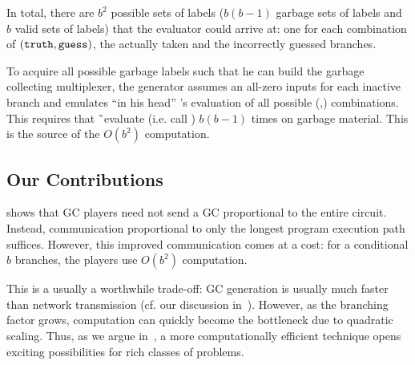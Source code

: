 In total, there are $b^2$ possible sets of labels ($b(b-1)$ garbage sets of labels and $b$ valid sets of labels)  that the evaluator
could arrive at: one for each combination of $(\mathtt{truth},\mathtt{guess})$, the  actually taken  and
the incorrectly guessed branches.
%


To acquire all possible garbage labels such that he can build the
garbage collecting multiplexer, the \HK generator assumes an all-zero
inputs for each
inactive branch and emulates ``in his head'' \E's evaluation of all possible (\truth,\guess) combinations.
This requires that \G\ evaluate (i.e. call \Ev) $b(b-1)$ times on garbage material.
This is the source of the $O(b^2)$ computation.






\subsection{Our Contributions}
\label{sec:ourContrib}

\HK shows that GC players need not send a GC
proportional to the entire circuit.
Instead, communication proportional to only the longest program execution
path suffices.
However, this improved communication comes at a cost:
for a conditional $b$ branches, the players
use $O(b^2)$ computation. 

This is a usually a worthwhile trade-off: GC generation is usually
much faster than network transmission (cf. our discussion in~).
However, as the branching factor grows, computation
can quickly become the bottleneck due to quadratic scaling.
%
Thus, as we argue in~,
a more computationally efficient technique
opens exciting possibilities for rich classes of problems.

